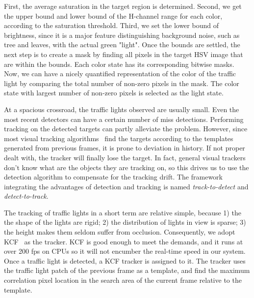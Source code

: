 First, the average saturation in the target region is determined. Second, we get the upper bound and lower bound of the H-channel range for each color, according to the saturation threshold. Third, we set the lower bound of brightness, since it is a major feature distinguishing background noise, such as tree and leaves, with the actual green "light". Once the bounds are settled, the next step is to create a mask by finding all pixels in the target HSV image that are within the bounds. Each color state has its corresponding bitwise masks. Now, we can have a nicely quantified representation of the color of the traffic light by comparing the total number of non-zero pixels in the mask. The color state with largest number of non-zero pixels is selected as the light state.


 At a spacious crossroad, the traffic lights observed are usually small. Even the most recent detectors can have a certain number of miss detections. Performing tracking on the detected targets can partly alleviate the problem. However, since most visual tracking algorithms~\cite{henriques-et-al:2015,nam-han:2016,bertinetto-et-al:2016,held-et-al:2016} find the targets according to the templates generated from previous frames, it is prone to deviation in history. If not proper dealt with, the tracker will finally lose the target. In fact, general visual trackers don't know what are the objects they are tracking on, so this drives us to use the detection algorithm to compensate for the tracking drift. The framework integrating the advantages of detection and tracking is named \emph{track-to-detect} and \emph{detect-to-track}.


    The tracking of traffic lights in a short term are relative simple, because 1) the the shape of the lights are rigid; 2) the distribution of lights in view is sparse; 3) the height makes them seldom suffer from occlusion. Consequently, we adopt KCF~\cite{henriques-et-al:2015} as the tracker. KCF is good enough to meet the demands, and it runs at over 200 fps on CPUs so it will not encumber the real-time speed in our system. Once a traffic light is detected, a KCF tracker is assigned to it. The tracker uses the traffic light patch of the previous frame as a template, and find the maximum correlation pixel location in the search area of the current frame relative to the template. 
  
 

